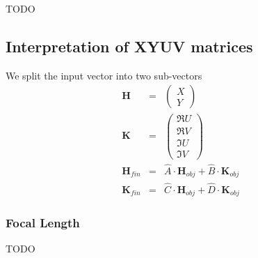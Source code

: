 \documentclass[12pt,a4paper,twoside,openright,BCOR10mm,headsepline,titlepage,abstracton,chapterprefix,final]{scrreprt}
\newcommand\Vector[1]{{\mathbf{#1}}}
\begin{document}
TODO


\subsection{Interpretation of XYUV matrices}

We split the input vector into two sub-vectors
\begin{eqnarray}
 \Vector{H} &=&
 \begin{pmatrix}
  X \\ Y
 \end{pmatrix}
 \\
 \Vector{K} &=&
 \begin{pmatrix}
  \Re U \\ \Re V \\ \Im U \\ \Im V 
 \end{pmatrix}
 \\
 \Vector{H}_{fin} &=& \hat{A} \cdot \Vector{H}_{obj} + \hat{B} \cdot \Vector{K}_{obj} \\
 \Vector{K}_{fin} &=& \hat{C} \cdot \Vector{H}_{obj} + \hat{D} \cdot \Vector{K}_{obj} 
\end{eqnarray}


\subsubsection{Focal Length}
TODO
\end{document}
